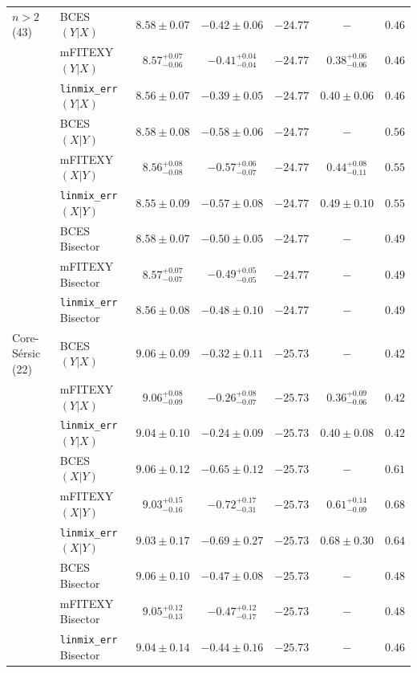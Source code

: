 \documentclass[preprint2]{emulateapj}
\begin{document}
\begin{table}
\begin{tabular}{llccccc}
$n>2$ (43)             & BCES $(Y|X)$      & $8.58 \pm 0.07$ & $-0.42 \pm 0.06$ & $-24.77$ & $-$ & $0.46$ \\
                       & mFITEXY $(Y|X)$    & $8.57^{+0.07}_{-0.06}$ & $-0.41^{+0.04}_{-0.04}$ & $-24.77$ & $0.38^{+0.06}_{-0.06}$ & $0.46$ \\
                       & {\tt linmix\_err} $(Y|X)$     & $8.56 \pm 0.07$ & $-0.39 \pm 0.05$ & $-24.77$ & $0.40 \pm 0.06$ & $0.46$ \\ [0.5em]
                       & BCES $(X|Y)$      & $8.58 \pm 0.08$ & $-0.58 \pm 0.06$ & $-24.77$ & $-$ & $0.56$ \\
                       & mFITEXY $(X|Y)$    & $8.56^{+0.08}_{-0.08}$ & $-0.57^{+0.06}_{-0.07}$ & $-24.77$ & $0.44^{+0.08}_{-0.11}$ & $0.55$ \\
                       & {\tt linmix\_err} $(X|Y)$     & $8.55 \pm 0.09$ & $-0.57 \pm 0.08$ & $-24.77$ & $0.49 \pm 0.10$ & $0.55$ \\ [0.5em]
                       & BCES Bisector     & $8.58 \pm 0.07$ & $-0.50 \pm 0.05$ & $-24.77$ & $-$ & $0.49$ \\
                       & mFITEXY Bisector   & $8.57^{+0.07}_{-0.07}$ & $-0.49^{+0.05}_{-0.05}$ & $-24.77$ & $-$    & $0.49$ \\
                       & {\tt linmix\_err} Bisector    & $8.56 \pm 0.08$ & $-0.48 \pm 0.10$ & $-24.77$ & $-$    & $0.49$ \\  [0.5em]
                   
Core-S\'ersic (22) & BCES $(Y|X)$   & $9.06 \pm 0.09$ & $-0.32 \pm 0.11$  & $-25.73$ & $-$    & $0.42$ \\
                   & mFITEXY $(Y|X)$   & $9.06^{+0.08}_{-0.09}$ & $-0.26^{+0.08}_{-0.07}$ & $-25.73$ & $0.36^{+0.09}_{-0.06}$ & $0.42$ \\
                   & {\tt linmix\_err} $(Y|X)$  & $9.04 \pm 0.10$ & $-0.24 \pm 0.09$ & $-25.73$ & $0.40 \pm 0.08$ & $0.42$ \\ [0.5em]
                   & BCES $(X|Y)$   & $9.06 \pm 0.12$ & $-0.65 \pm 0.12$  & $-25.73$ & $-$    & $0.61$ \\
                   & mFITEXY $(X|Y)$   & $9.03^{+0.15}_{-0.16}$ & $-0.72^{+0.17}_{-0.31}$ & $-25.73$ & $0.61^{+0.14}_{-0.09}$ & $0.68$ \\
                   & {\tt linmix\_err} $(X|Y)$  & $9.03 \pm 0.17$ & $-0.69 \pm 0.27$ & $-25.73$ & $0.68 \pm 0.30$ & $0.64$ \\ [0.5em]
                   & BCES Bisector  & $9.06 \pm 0.10$ & $-0.47 \pm 0.08$  & $-25.73$ & $-$    & $0.48$ \\
                   & mFITEXY Bisector  & $9.05^{+0.12}_{-0.13}$ & $-0.47^{+0.12}_{-0.17}$ & $-25.73$ & $-$    & $0.48$ \\
                   & {\tt linmix\_err} Bisector & $9.04 \pm 0.14$ & $-0.44 \pm 0.16$ & $-25.73$ & $-$    & $0.46$ \\ [0.5em]


\end{tabular}
\end{table}
\end{document}

